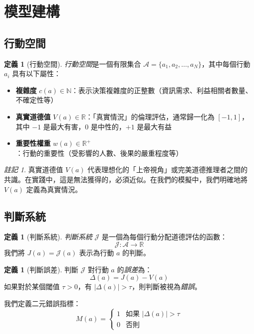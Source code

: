 \documentclass[12pt,a4paper]{article}
\theoremstyle{definition}
\newtheorem{definition}[theorem]{定義}
\theoremstyle{remark}
\newtheorem{remark}[theorem]{註記}
\begin{document}
\section{模型建構}
\label{sec:formalization}

\subsection{行動空間}

\begin{definition}[行動空間]
\emph{行動空間}是一個有限集合 $\mathcal{A} = \{a_1, a_2, \ldots, a_N\}$，其中每個行動 $a_i$ 具有以下屬性：
\begin{itemize}
    \item \textbf{複雜度} $c(a) \in \mathbb{N}$：表示決策複雜度的正整數（資訊需求、利益相關者數量、不確定性等）
    \item \textbf{真實道德值} $V(a) \in \mathbb{R}$：「真實情況」的倫理評估，通常歸一化為 $[-1, 1]$，其中 $-1$ 是最大有害，$0$ 是中性的，$+1$ 是最大有益
    \item \textbf{重要性權重} $w(a) \in \mathbb{R}^+$：行動的重要性（受影響的人數、後果的嚴重程度等）
\end{itemize}
\end{definition}

\begin{remark}
真實道德值 $V(a)$ 代表理想化的「上帝視角」或完美道德推理者之間的共識。在實踐中，這是無法獲得的，必須近似。在我們的模擬中，我們明確地將 $V(a)$ 定義為真實情況。
\end{remark}

\subsection{判斷系統}

\begin{definition}[判斷系統]
\emph{判斷系統} $\mathcal{J}$ 是一個為每個行動分配道德評估的函數：
\[
\mathcal{J}: \mathcal{A} \to \mathbb{R}
\]
我們將 $J(a) = \mathcal{J}(a)$ 表示為行動 $a$ 的判斷。
\end{definition}

\begin{definition}[判斷誤差]
判斷 $\mathcal{J}$ 對行動 $a$ 的\emph{誤差}為：
\[
\Delta(a) = J(a) - V(a)
\]
如果對於某個閾值 $\tau > 0$，有 $|\Delta(a)| > \tau$，則判斷被視為\emph{錯誤}。
\end{definition}

我們定義二元錯誤指標：
\[
M(a) = \begin{cases}
1 & \text{如果 } |\Delta(a)| > \tau \\
0 & \text{否則}
\end{cases}
\]
\end{document}
